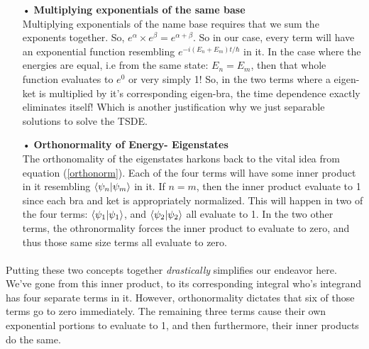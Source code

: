 \documentclass[12pt,letterpaper]{book}
\begin{document}
\begin{enumerate}
\item[•]\textbf{Multiplying exponentials of the same base}\\
Multiplying exponentials of the name base requires that we sum the exponents together. So, $e^{\alpha} \times e^{\beta} = e^{\alpha + \beta}$. So in our case, every term will have an exponential function resembling $e^{-i(E_n + E_m)t/\hbar}$ in it. In the case where the energies are equal, i.e from the same state: $E_n = E_m$, then that whole function evaluates to $e^0$ or very simply 1! So, in the two terms where a eigen-ket is multiplied by it's corresponding eigen-bra, the time dependence exactly eliminates itself! Which is another justification why we just separable solutions to solve the TSDE. 
\item[•]\textbf{Orthonormality of Energy- Eigenstates}\\
The orthonomality of the eigenstates harkons back to the vital idea from equation (\ref{orthonorm}). Each of the four terms will have some inner product in it resembling $\braket{\psi_n}{\psi_m}$ in it. If $n = m$, then the inner product evaluate to 1 since each bra and ket is appropriately normalized. This will happen in two of the four terms: $\braket{\psi_1}{\psi_1}$, and 
$\braket{\psi_2}{\psi_2}$ all  evaluate to 1.  In the two other terms, the othronormality forces the inner product to evaluate to zero, and thus those same size terms all evaluate to zero.
\end{enumerate}

\paragraph*{}Putting these two concepts together \textit{drastically} simplifies our endeavor here. We've gone from this inner product, to its corresponding integral who's integrand has four separate terms in it. However, orthonormality dictates that six of those terms go to zero immediately. The remaining three terms cause their own exponential portions to evaluate to 1, and then furthermore, their inner products do the same. 
\end{document}
